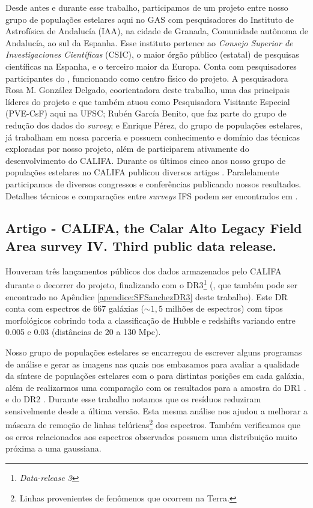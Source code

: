 Desde antes e durante esse trabalho, participamos de um projeto entre nosso grupo de populações estelares aqui no GAS com pesquisadores do Instituto de Astrofísica de Andalucía (IAA), na cidade de Granada, Comunidade autônoma de Andalucía, ao sul da Espanha. Esse instituto pertence ao {\em Consejo Superior de Investigaciones Científicas} (CSIC), o maior órgão público (estatal) de pesquisas científicas na Espanha, e o terceiro maior da Europa. Conta com pesquisadores participantes do \CALS, funcionando como centro físico do projeto. A pesquisadora Rosa M. González Delgado, coorientadora deste trabalho, uma das principais líderes do projeto e que também atuou como Pesquisadora Visitante Especial (PVE-CsF) aqui na UFSC; Rubén García Benito, que faz parte do grupo de redução dos dados do {\em survey}; e Enrique Pérez, do grupo de populações estelares, já trabalham em nossa parceria e possuem conhecimento e domínio das técnicas exploradas por nosso projeto, além de participarem ativamente do desenvolvimento do CALIFA. Durante os últimos cinco anos nosso grupo de populações estelares no CALIFA publicou diversos artigos \citep[e.g.,][]{Perez.etal.2013a, GonzalezDelgado.etal.2014a, GonzalezDelgado.etal.2014b, GonzalezDelgado.etal.2015a, GonzalezDelgado.etal.2016a, deAmorim.etal.2017, GonzalezDelgado.etal.2017, RGB.etal.2017, Lacerda.etal.2017}. Paralelamente participamos de diversos congressos e conferências publicando nossos resultados. Detalhes técnicos e comparações entre {\em surveys} IFS podem ser encontrados em \citet{Andre2015}.


\subsection{Artigo - CALIFA, the Calar Alto Legacy Field Area survey IV. Third public data release.}
\label{sec:intro:UFSCeIAA:DR3}

Houveram três lançamentos públicos dos dados armazenados pelo CALIFA durante o decorrer do projeto, finalizando com o DR3\footnote{\em Data-release 3} (\citealt{SFSanchez.DR3.2016}, que também pode ser encontrado no Apêndice \ref{apendice:SFSanchezDR3} deste trabalho). Este DR conta com espectros de 667 galáxias ($\sim 1,5$ milhões de espectros) com tipos morfológicos cobrindo toda a classificação de Hubble e redshifts variando entre 0.005 e 0.03 (distâncias de 20 a 130 Mpc).

Nosso grupo de populações estelares se encarregou de escrever alguns programas de análise e gerar as imagens nas quais nos embasamos para avaliar a qualidade da síntese de populações estelares com o \starlight para distintas posições em cada galáxia, além de realizarmos uma comparação com os resultados para a amostra do DR1 \citep{Husemann.etal.2013a}.  e do DR2 \citealt{GarciaBenito.etal.2015a}. Durante esse trabalho notamos que os resíduos reduziram sensivelmente desde a última versão. Esta mesma análise nos ajudou a melhorar a máscara de remoção de linhas telúricas\footnote{Linhas provenientes de fenômenos que ocorrem na Terra.} dos espectros. Também verificamos que os erros relacionados aos espectros observados possuem uma distribuição muito próxima a uma gaussiana.


